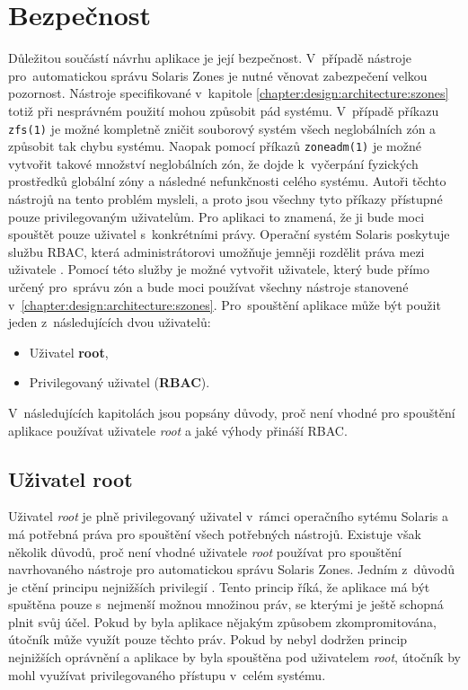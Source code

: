 \section{Bezpečnost}
\label{chapter:design:security}
Důležitou součástí návrhu aplikace je její bezpečnost. V~případě nástroje pro~automatickou správu Solaris Zones je nutné věnovat
zabezpečení velkou pozornost. Nástroje specifikované v~kapitole \ref{chapter:design:architecture:szones} totiž při nesprávném
použití mohou způsobit pád systému. V~případě příkazu \verb|zfs(1)| je možné kompletně zničit souborový systém všech neglobálních zón
a způsobit tak chybu systému. Naopak pomocí příkazů \verb|zoneadm(1)| je možné vytvořit takové množství neglobálních zón, že
dojde k~vyčerpání fyzických prostředků globální zóny a následné nefunkčnosti celého systému. Autoři těchto nástrojů na tento
problém mysleli, a proto jsou všechny tyto příkazy přístupné pouze privilegovaným uživatelům. Pro aplikaci to znamená, že ji 
bude moci spouštět pouze uživatel s~konkrétními právy. Operační systém Solaris poskytuje službu RBAC,
která administrátorovi umožňuje jemněji rozdělit práva mezi uživatele \cite{oracle:solaris:desing:rbac}. Pomocí této služby
je možné vytvořit uživatele, který bude
přímo určený pro~správu zón a bude moci používat všechny nástroje stanovené v~\ref{chapter:design:architecture:szones}. Pro~spouštění
aplikace může být použit jeden z~následujících dvou uživatelů:
\begin{itemize}
 \item Uživatel \textbf{root},
 \item Privilegovaný uživatel (\textbf{RBAC}).
\end{itemize}
V~následujících kapitolách jsou popsány důvody, proč není vhodné pro spouštění aplikace používat uživatele \textit{root} a 
jaké výhody přináší RBAC.
\subsection{Uživatel root}
\label{chapter:design:security:root}
Uživatel \textit{root} je plně privilegovaný uživatel v~rámci operačního sytému Solaris a má potřebná práva pro spouštění všech
potřebných nástrojů. Existuje však několik důvodů, proč není vhodné uživatele \textit{root} používat pro spouštění navrhovaného
nástroje pro automatickou správu Solaris Zones. Jedním z~důvodů je ctění principu nejnižších privilegií 
\cite{cvut:presentations:least_user_privilege}. Tento princip říká, že aplikace má být spuštěna pouze s~nejmenší možnou množinou
práv, se kterými je ještě schopná plnit svůj účel. Pokud by byla aplikace nějakým způsobem zkompromitována, útočník může využít
pouze těchto práv. Pokud by nebyl dodržen princip nejnižších oprávnění a aplikace by byla spouštěna pod uživatelem \textit{root},
útočník by mohl využívat privilegovaného přístupu v~celém systému.

